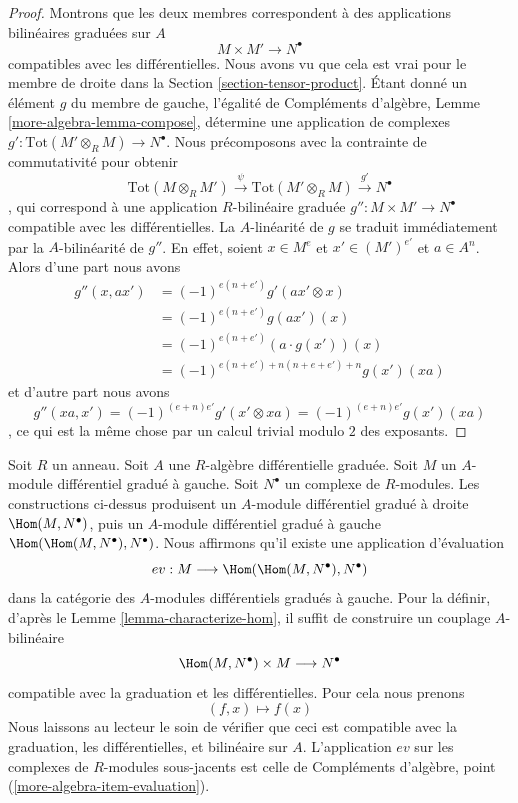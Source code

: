 \begin{proof}
Montrons que les deux membres correspondent à des applications bilinéaires graduées
sur $A$
$$
M \times M' \longrightarrow N^\bullet
$$
compatibles avec les différentielles. Nous avons vu que cela est vrai pour le membre
de droite dans la Section \ref{section-tensor-product}. Étant donné un élément $g$ du
membre de gauche, l'égalité de Compléments d'algèbre, Lemme
\ref{more-algebra-lemma-compose}, détermine une application de complexes $g' :
\text{Tot}(M' \otimes_R M) \to N^\bullet$. Nous précomposons avec la contrainte de
commutativité pour obtenir
$$
\text{Tot}(M \otimes_R M') \xrightarrow{\psi}
\text{Tot}(M' \otimes_R M) \xrightarrow{g'}
N^\bullet
$$
, qui correspond à une application $R$-bilinéaire graduée $g'' : M \times M' \to
N^\bullet$ compatible avec les différentielles. La $A$-linéarité de $g$ se traduit
immédiatement par la $A$-bilinéarité de $g''$. En effet, soient $x \in M^e$ et $x'
\in (M')^{e'}$ et $a \in A^n$. Alors d'une part nous avons
\begin{align*}
g''(x, ax')
& =
(-1)^{e(n + e')} g'(ax' \otimes x) \\
& =
(-1)^{e(n + e')} g(ax')(x) \\
& =
(-1)^{e(n + e')} (a \cdot g(x'))(x) \\
& =
(-1)^{e(n + e') + n(n + e + e') + n} g(x')(xa)
\end{align*}
et d'autre part nous avons
$$
g''(xa, x') = (-1)^{(e + n)e'} g'(x' \otimes xa) =
(-1)^{(e + n)e'} g(x')(xa) 
$$
, ce qui est la même chose par un calcul trivial modulo $2$ des exposants.
\end{proof}

\begin{remark}
\label{remark-evaluation-map-left}
Soit $R$ un anneau. Soit $A$ une $R$-algèbre différentielle graduée. Soit $M$ un
$A$-module différentiel gradué à gauche. Soit $N^\bullet$ un complexe de
$R$-modules. Les constructions ci-dessus produisent un $A$-module différentiel
gradué à droite $\Hom(M, N^\bullet)$, puis un $A$-module différentiel gradué
à gauche $\Hom(\Hom(M, N^\bullet), N^\bullet)$. Nous affirmons qu'il existe une
application d'évaluation
$$
ev : M \longrightarrow \Hom(\Hom(M, N^\bullet), N^\bullet)
$$
dans la catégorie des $A$-modules différentiels gradués à gauche. Pour la définir,
d'après le Lemme \ref{lemma-characterize-hom}, il suffit de construire un couplage
$A$-bilinéaire
$$
\Hom(M, N^\bullet) \times M \longrightarrow N^\bullet
$$
compatible avec la graduation et les différentielles. Pour cela nous prenons
$$
(f, x) \longmapsto f(x)
$$
Nous laissons au lecteur le soin de vérifier que ceci est compatible avec la
graduation, les différentielles, et bilinéaire sur $A$. L'application $ev$ sur les
complexes de $R$-modules sous-jacents est celle de Compléments d'algèbre, point
(\ref{more-algebra-item-evaluation}).
\end{remark}


